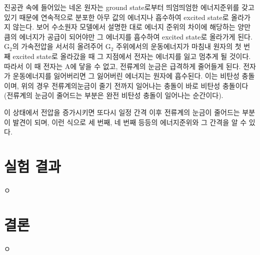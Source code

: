 \documentclass[a4paper, 10pt, nanum]{CSUniSchoolLabReport}
\begin{document}
	진공관 속에 들어있는 네온 원자는 ground state로부터 띄엄띄엄한 에너지준위를 갖고 있기 때문에 연속적으로 분포한 아무 값의 에너지나 흡수하여 excited state로 올라가지 않는다. 보어 수소원자 모델에서 설명한 대로 에너지 준위의 차이에 해당하는 양만큼의 에너지가 공급이 되어야만 그 에너지를 흡수하여 excited state로 올라가게 된다. G$_2$의 가속전압을 서서히 올려주어 G$_2$ 주위에서의 운동에너지가 마침내 원자의 첫 번째 excited state로 올라갔을 때 그 지점에서 전자는 에너지를 잃고 멈추게 될 것이다. 따라서 이 때 전자는 A에 닿을 수 없고, 전류계의 눈금은 급격하게 줄어들게 된다. 전자가 운동에너지를 잃어버리면 그 잃어버린 에너지는 원자에 흡수된다. 이는 비탄성 충돌이며, 위의 경우 전류계의눈금이 줄기 전까지 일어나는 충돌이 바로 비탄성 충돌이다(전류계의 눈금이 줄어드는 부분은 완전 비탄성 충돌이 일어나는 순간이다).

	이 상태에서 전압을 증가시키면 또다시 일정 간격 이후 전류계의 눈금이 줄어드는 부분이 발견이 되며, 이런 식으로 세 번째, 네 번째 등등의 에너지준위와 그 간격을 알 수 있다.


\section{실험 결과}

	ㅇ



\section{결론}

	ㅇ



\end{document}
